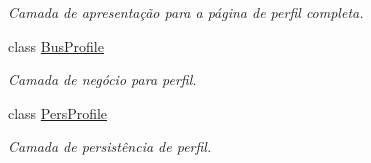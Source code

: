 \begin{DoxyCompactItemize}
\begin{DoxyCompactList}\small\item\em Camada de apresentação para a página de perfil completa. \end{DoxyCompactList}\item 
class \hyperlink{classProfile_1_1ProfileUnit_1_1BusProfile}{Bus\-Profile}
\begin{DoxyCompactList}\small\item\em Camada de negócio para perfil. \end{DoxyCompactList}\item 
class \hyperlink{classProfile_1_1ProfileUnit_1_1PersProfile}{Pers\-Profile}
\begin{DoxyCompactList}\small\item\em Camada de persistência de perfil. \end{DoxyCompactList}\end{DoxyCompactItemize}
